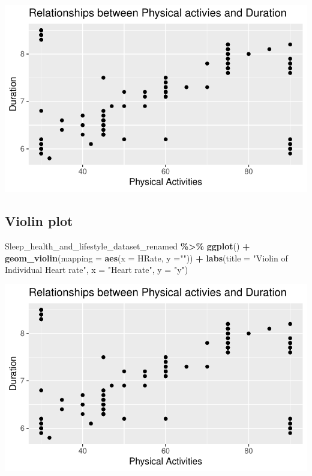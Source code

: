 \documentclass[
  11pt,
]{article}
\newenvironment{Shaded}{\begin{snugshade}}{\end{snugshade}}
\newcommand{\AttributeTok}[1]{\textcolor[rgb]{0.13,0.29,0.53}{#1}}
\newcommand{\FunctionTok}[1]{\textcolor[rgb]{0.13,0.29,0.53}{\textbf{#1}}}
\newcommand{\NormalTok}[1]{#1}
\newcommand{\SpecialCharTok}[1]{\textcolor[rgb]{0.81,0.36,0.00}{\textbf{#1}}}
\newcommand{\StringTok}[1]{\textcolor[rgb]{0.31,0.60,0.02}{#1}}
\begin{document}
\begin{center}\includegraphics[width=0.7\linewidth]{SleepHelath_files/figure-latex/unnamed-chunk-23-1} \end{center}

\hypertarget{violin-plot}{%
\subsection{Violin plot}\label{violin-plot}}

\begin{Shaded}
\begin{Highlighting}[]
\NormalTok{Sleep\_health\_and\_lifestyle\_dataset\_renamed }\SpecialCharTok{\%\textgreater{}\%}
  \FunctionTok{ggplot}\NormalTok{() }\SpecialCharTok{+}
    \FunctionTok{geom\_violin}\NormalTok{(}\AttributeTok{mapping =} \FunctionTok{aes}\NormalTok{(}\AttributeTok{x =}\NormalTok{ HRate, }\AttributeTok{y =}\StringTok{""}\NormalTok{)) }\SpecialCharTok{+}
    \FunctionTok{labs}\NormalTok{(}\AttributeTok{title =} \StringTok{"Violin of Individual Heart rate"}\NormalTok{, }\AttributeTok{x =} \StringTok{"Heart rate"}\NormalTok{, }\AttributeTok{y =} \StringTok{"y"}\NormalTok{)}
\end{Highlighting}
\end{Shaded}

\begin{center}\includegraphics[width=0.7\linewidth]{SleepHelath_files/figure-latex/unnamed-chunk-24-1} \end{center}
\end{document}
